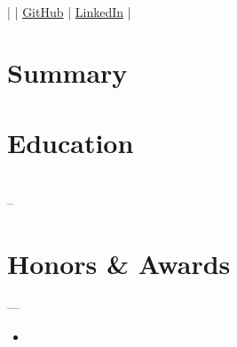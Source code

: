 \documentclass[10pt,a4paper]{article}
\providecommand{\VAR}[1]{}
\providecommand{\BLOCK}[1]{}
\begin{document}
\pagestyle{empty}

\begin{center}
    {\huge \textbf{\VAR{name}}} \\ \vspace{4pt}
    \VAR{phone} | \href{mailto:\VAR{email}}{\VAR{email}} | \href{\VAR{github}}{GitHub} | \href{\VAR{linkedin}}{LinkedIn} | \VAR{location}
\end{center}
\vspace{2pt}

\BLOCK{for section_name in section_order}

\BLOCK{if section_name == 'summary' and summary}
\section*{Summary}
\VAR{summary}
\vspace{2pt}

\BLOCK{elif section_name == 'education' and education and education|length > 0}
\section*{Education}
\BLOCK{for edu in education}
\noindent \textbf{\VAR{edu.institution}} \hfill \VAR{edu.location} \\
\textit{\VAR{edu.degree}} \hfill \VAR{edu.start_date} -- \VAR{edu.end_date or 'Present'}
\vspace{2pt}
\BLOCK{endfor}

\BLOCK{elif section_name == 'awards' and awards and awards|length > 0}
\section*{Honors \& Awards}
\BLOCK{for award in awards}
\noindent \textbf{\VAR{award.title}} --- \textit{\VAR{award.event}} \hfill \VAR{award.year}
\BLOCK{if award.bullets and award.bullets|length > 0}
\begin{itemize}[leftmargin=1.5em, itemsep=1pt, parsep=0pt, topsep=2pt]
    \BLOCK{for bullet in award.bullets}
    \item \VAR{bullet.text}
    \BLOCK{endfor}
\end{itemize}
\BLOCK{endif}
\vspace{2pt}
\BLOCK{endfor}

\BLOCK{elif section_name == 'experience' and experience and experience|length > 0}
\end{document}
